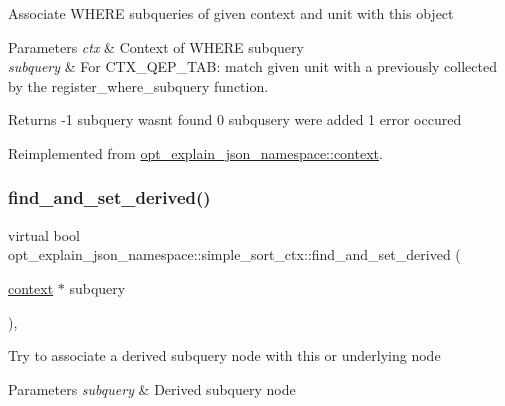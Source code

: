 Associate W\+H\+E\+RE subqueries of given context and unit with this object


\begin{DoxyParams}{Parameters}
{\em ctx} & Context of W\+H\+E\+RE subquery \\
\hline
{\em subquery} & For C\+T\+X\+\_\+\+Q\+E\+P\+\_\+\+T\+AB\+: match given unit with a previously collected by the register\+\_\+where\+\_\+subquery function. \\
\hline
\end{DoxyParams}
\begin{DoxyReturn}{Returns}
-\/1 subquery wasn\textquotesingle{}t found 0 subqusery were added 1 error occured 
\end{DoxyReturn}


Reimplemented from \mbox{\hyperlink{classopt__explain__json__namespace_1_1context_ae6606674e90fec03200823c35994873c}{opt\+\_\+explain\+\_\+json\+\_\+namespace\+::context}}.

\mbox{\label{classopt__explain__json__namespace_1_1simple__sort__ctx_ae6d87919605c73b23b177c042b0935be}} 
\subsubsection{\texorpdfstring{find\+\_\+and\+\_\+set\+\_\+derived()}{find\_and\_set\_derived()}}
{\footnotesize\ttfamily virtual bool opt\+\_\+explain\+\_\+json\+\_\+namespace\+::simple\+\_\+sort\+\_\+ctx\+::find\+\_\+and\+\_\+set\+\_\+derived (\begin{DoxyParamCaption}\item[{\mbox{\hyperlink{classopt__explain__json__namespace_1_1context}{context}} $\ast$}]{subquery }\end{DoxyParamCaption})\hspace{0.3cm}{\ttfamily [inline]}, {\ttfamily [virtual]}}

Try to associate a derived subquery node with this or underlying node


\begin{DoxyParams}{Parameters}
{\em subquery} & Derived subquery node\\
\hline
\end{DoxyParams}

